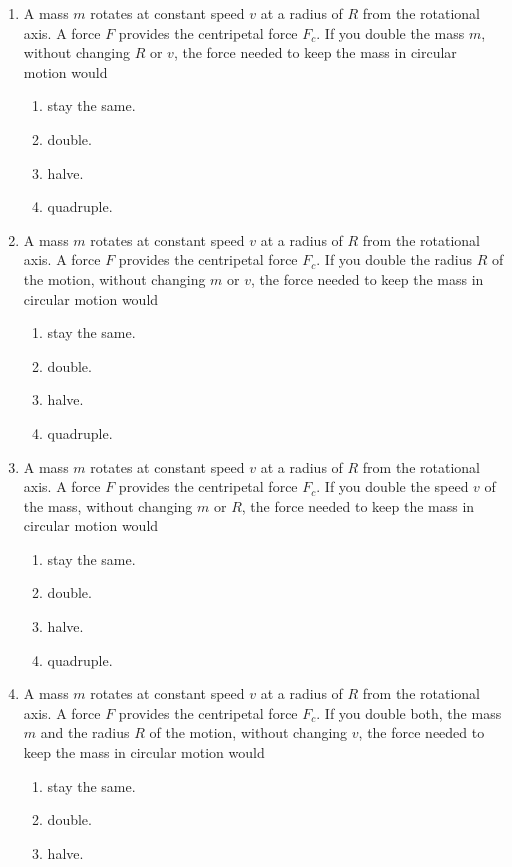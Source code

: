 \begin{enumerate}
\item A mass $m$ rotates at constant speed $v$ at a radius of $R$ from the rotational axis. A force $F$ provides the centripetal force $F_{c}$. If you double the mass $m$, without changing $R$ or $v$, the force needed to keep the mass in circular motion would
  \begin{enumerate}
  \item stay the same.
  \item double.
  \item halve.
  \item quadruple.
  \end{enumerate}
\item A mass $m$ rotates at constant speed $v$ at a radius of $R$ from the rotational axis. A force $F$ provides the centripetal force $F_{c}$. If you double the radius $R$ of the motion, without changing $m$ or $v$, the force needed to keep the mass in circular motion would
  \begin{enumerate}
  \item stay the same.
  \item double.
  \item halve.
  \item quadruple.
  \end{enumerate}
\item A mass $m$ rotates at constant speed $v$ at a radius of $R$ from the rotational axis. A force $F$ provides the centripetal force $F_{c}$. If you double the speed $v$ of the mass, without changing $m$ or $R$, the force needed to keep the mass in circular motion would
  \begin{enumerate}
  \item stay the same.
  \item double.
  \item halve.
  \item quadruple.
  \end{enumerate}
\item A mass $m$ rotates at constant speed $v$ at a radius of $R$ from the rotational axis. A force $F$ provides the centripetal force $F_{c}$. If you double both, the mass $m$ and the radius $R$ of the motion, without changing $v$, the force needed to keep the mass in circular motion would
  \begin{enumerate}
  \item stay the same.
  \item double.
  \item halve.

\end{enumerate}
\end{enumerate}
